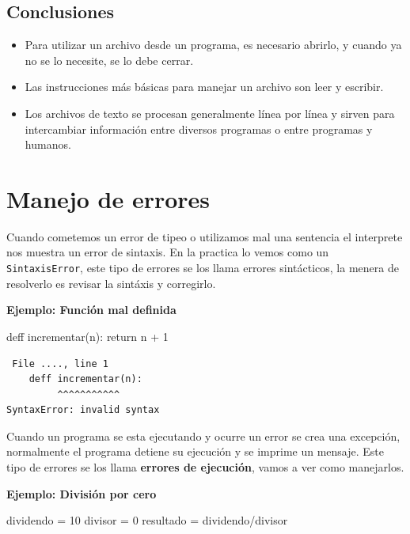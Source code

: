 \documentclass[
  letterpaper,
  DIV=11,
  numbers=noendperiod]{scrreprt}
\newenvironment{Shaded}{\begin{snugshade}}{\end{snugshade}}
\newcommand{\ControlFlowTok}[1]{\textcolor[rgb]{0.00,0.23,0.31}{#1}}
\newcommand{\DecValTok}[1]{\textcolor[rgb]{0.68,0.00,0.00}{#1}}
\newcommand{\NormalTok}[1]{\textcolor[rgb]{0.00,0.23,0.31}{#1}}
\newcommand{\OperatorTok}[1]{\textcolor[rgb]{0.37,0.37,0.37}{#1}}
\providecommand{\tightlist}{%
  \setlength{\itemsep}{0pt}\setlength{\parskip}{0pt}}\usepackage{longtable,booktabs,array}
\begin{document}
\subsection{Conclusiones}\label{conclusiones}

\begin{itemize}
\tightlist
\item
  Para utilizar un archivo desde un programa, es necesario abrirlo, y
  cuando ya no se lo necesite, se lo debe cerrar.
\item
  Las instrucciones más básicas para manejar un archivo son leer y
  escribir.
\item
  Los archivos de texto se procesan generalmente línea por línea y
  sirven para intercambiar información entre diversos programas o entre
  programas y humanos.
\end{itemize}

\section{Manejo de errores}\label{manejo-de-errores}

Cuando cometemos un error de tipeo o utilizamos mal una sentencia el
interprete nos muestra un error de sintaxis. En la practica lo vemos
como un \texttt{SintaxisError}, este tipo de errores se los llama
errores sintácticos, la menera de resolverlo es revisar la sintáxis y
corregirlo.

\textbf{Ejemplo: Función mal definida}

\begin{Shaded}
\begin{Highlighting}[]
\NormalTok{deff incrementar(n):}
  \ControlFlowTok{return}\NormalTok{ n }\OperatorTok{+} \DecValTok{1}
\end{Highlighting}
\end{Shaded}

\begin{verbatim}
 File ...., line 1
    deff incrementar(n):
         ^^^^^^^^^^^
SyntaxError: invalid syntax
\end{verbatim}

Cuando un programa se esta ejecutando y ocurre un error se crea una
excepción, normalmente el programa detiene su ejecución y se imprime un
mensaje. Este tipo de errores se los llama \textbf{errores de
ejecución}, vamos a ver como manejarlos.

\textbf{Ejemplo: División por cero}

\begin{Shaded}
\begin{Highlighting}[]
\NormalTok{dividendo }\OperatorTok{=} \DecValTok{10}
\NormalTok{divisor }\OperatorTok{=} \DecValTok{0}
\NormalTok{resultado }\OperatorTok{=}\NormalTok{ dividendo}\OperatorTok{/}\NormalTok{divisor }
\end{Highlighting}
\end{Shaded}
\end{document}
